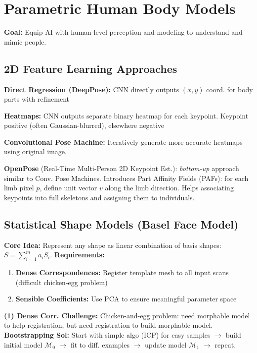
\section{Parametric Human Body Models}

\textbf{Goal:} Equip AI with human-level perception and modeling to understand and mimic people.

\subsection{2D Feature Learning Approaches}

\textbf{Direct Regression (DeepPose):} CNN directly outputs $(x,y)$ coord. for body parts with refinement

\textbf{Heatmaps:} CNN outputs separate binary heatmap for each keypoint. Keypoint positive (often Gaussian-blurred), elsewhere negative

\textbf{Convolutional Pose Machine:} Iteratively generate more accurate heatmaps using original image.

\textbf{OpenPose} (Real-Time Multi-Person 2D Keypoint Est.): \textit{bottom-up} approach similar to Conv. Pose Machines. Introduces Part Affinity Fields (PAFs): for each limb pixel $p$, define unit vector $v$ along the limb direction. Helps associating keypoints into full skeletons and assigning them to individuals.


\subsection{Statistical Shape Models {\scriptsize{(Basel Face Model)}}}

\textbf{Core Idea:} Represent any shape as linear combination of basis shapes:  $S = \sum_{i=1}^m a_i S_i$.
\quad \textbf{Requirements:}
\begin{enumerate}
\item \textbf{Dense Correspondences:} Register template mesh to all input scans (difficult chicken-egg problem)
\item \textbf{Sensible Coefficients:} Use PCA to ensure meaningful parameter space
\end{enumerate}

\textbf{(1) Dense Corr. Challenge:} Chicken-and-egg problem: need morphable model to help registration, but need registration to build morphable model. \textbf{Bootstrapping Sol:} Start with simple algo (ICP) for easy samples $\to$ build initial model $\mathcal{M}_0$ $\to$ fit to diff. examples $\to$ update model $\mathcal{M}_1$ $\to$ repeat.

